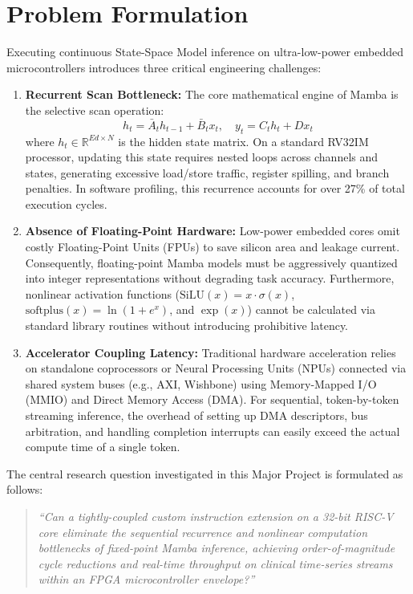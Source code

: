 \documentclass[11pt,a4paper,oneside]{report}
\begin{document}
\section{Problem Formulation}
Executing continuous State-Space Model inference on ultra-low-power embedded microcontrollers introduces three critical engineering challenges:
\begin{enumerate}
    \item \textbf{Recurrent Scan Bottleneck:} The core mathematical engine of Mamba is the selective scan operation:
    \begin{equation}
        h_t = \bar{A}_t h_{t-1} + \bar{B}_t x_t, \quad y_t = C_t h_t + D x_t
    \end{equation}
    where $h_t \in \mathbb{R}^{Ed \times N}$ is the hidden state matrix. On a standard RV32IM processor, updating this state requires nested loops across channels and states, generating excessive load/store traffic, register spilling, and branch penalties. In software profiling, this recurrence accounts for over 27\% of total execution cycles.
    \item \textbf{Absence of Floating-Point Hardware:} Low-power embedded cores omit costly Floating-Point Units (FPUs) to save silicon area and leakage current. Consequently, floating-point Mamba models must be aggressively quantized into integer representations without degrading task accuracy. Furthermore, nonlinear activation functions ($\text{SiLU}(x) = x \cdot \sigma(x)$, $\text{softplus}(x) = \ln(1 + e^x)$, and $\exp(x)$) cannot be calculated via standard library routines without introducing prohibitive latency.
    \item \textbf{Accelerator Coupling Latency:} Traditional hardware acceleration relies on standalone coprocessors or Neural Processing Units (NPUs) connected via shared system buses (e.g., AXI, Wishbone) using Memory-Mapped I/O (MMIO) and Direct Memory Access (DMA). For sequential, token-by-token streaming inference, the overhead of setting up DMA descriptors, bus arbitration, and handling completion interrupts can easily exceed the actual compute time of a single token.
\end{enumerate}

The central research question investigated in this Major Project is formulated as follows:
\begin{quote}
\textit{``Can a tightly-coupled custom instruction extension on a 32-bit RISC-V core eliminate the sequential recurrence and nonlinear computation bottlenecks of fixed-point Mamba inference, achieving order-of-magnitude cycle reductions and real-time throughput on clinical time-series streams within an FPGA microcontroller envelope?''}
\end{quote}
\end{document}

